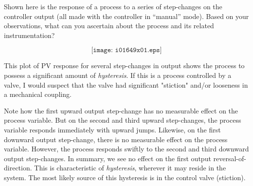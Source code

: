 

Shown here is the response of a process to a series of step-changes on the controller output (all made with the controller in ``manual'' mode).  Based on your observations, what can you ascertain about the process and its related instrumentation?

$$\texttt{[image: i01649x01.eps]}$$







This plot of PV response for several step-changes in output shows the process to possess a significant amount of {\it hysteresis}.  If this is a process controlled by a valve, I would suspect that the valve had significant "stiction" and/or looseness in a mechanical coupling.

Note how the first upward output step-change has no measurable effect on the process variable.  But on the second and third upward step-changes, the process variable responds immediately with upward jumps.  Likewise, on the first downward output step-change, there is no measurable effect on the process variable.  However, the process responds swiftly to the second and third downward output step-changes.  In summary, we see no effect on the first output reversal-of-direction.  This is characteristic of {\it hysteresis}, wherever it may reside in the system.  The most likely source of this hysteresis is in the control valve (stiction).










